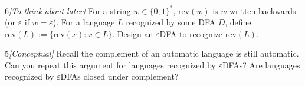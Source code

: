 \documentclass[12pt]{article}
\begin{document}
\begin{problem}{6}\textit{[To think about later]}
For a string $w \in \{0,1\}^*$, $\mathrm{rev}(w)$ is $w$ written backwards (or $\varepsilon$ if $w = \varepsilon$). For a language $L$
recognized by some DFA $D$, define $\mathrm{rev}(L) := \{\mathrm{rev}(x) : x \in L\}$. Design an $\varepsilon$DFA to recognize
$\mathrm{rev}(L)$.
\end{problem}

\begin{problem}{5}\textit{[Conceptual]}
Recall the complement of an automatic language is still automatic. Can you repeat this argument for languages recognized by $\varepsilon$DFAs? Are languages recognized by $\varepsilon$DFAs closed under complement?
\end{problem}
\end{document}
